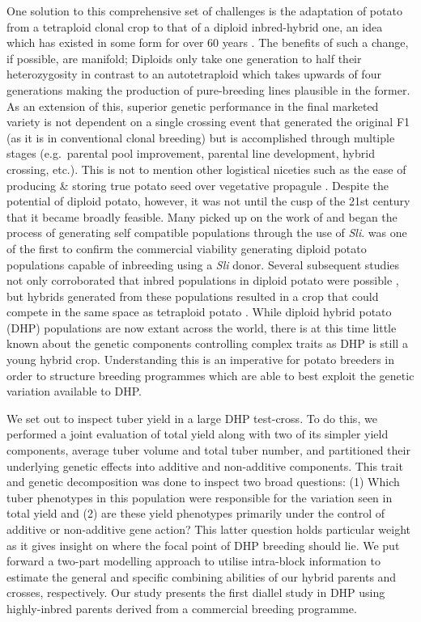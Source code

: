 One solution to this comprehensive set of challenges is the adaptation of potato from a tetraploid clonal crop to that of a diploid inbred-hybrid one, an idea which has existed in some form for over 60 years \parencite{Hougas1958}. The benefits of such a change, if possible, are manifold; Diploids only take one generation to half their heterozygosity in contrast to an autotetraploid which takes upwards of four generations making the production of pure-breeding lines plausible in the former. As an extension of this, superior genetic performance in the final marketed variety is not dependent on a single crossing event that generated the original F1 (as it is in conventional clonal breeding) but is accomplished through multiple stages (e.g.~parental pool improvement, parental line development, hybrid crossing, etc.). This is not to mention other logistical niceties such as the ease of producing \& storing true potato seed over vegetative propagule \parencite{Cock1983, Pallais1991, Thomas-Sharma2016}. Despite the potential of diploid potato, however, it was not until the cusp of the 21st century that it became broadly feasible. Many picked up on the work of \parencite{Hosaka1998} and began the process of generating self compatible populations through the use of \emph{Sli}. \parencite{Lindhout2011} was one of the first to confirm the commercial viability generating diploid potato populations capable of inbreeding using a \emph{Sli} donor. Several subsequent studies not only corroborated that inbred populations in diploid potato were possible \parencite{Alsahlany2021}, but hybrids generated from these populations resulted in a crop that could compete in the same space as tetraploid potato \parencite{Stockem2020, Zhang2021}. While diploid hybrid potato (DHP) populations are now extant across the world, there is at this time little known about the genetic components controlling complex traits as DHP is still a young hybrid crop. Understanding this is an imperative for potato breeders in order to structure breeding programmes which are able to best exploit the genetic variation available to DHP.

We set out to inspect tuber yield in a large DHP test-cross. To do this, we performed a joint evaluation of total yield along with two of its simpler yield components, average tuber volume and total tuber number, and partitioned their underlying genetic effects into additive and non-additive components. This trait and genetic decomposition was done to inspect two broad questions: (1) Which tuber phenotypes in this population were responsible for the variation seen in total yield and (2) are these yield phenotypes primarily under the control of additive or non-additive gene action? This latter question holds particular weight as it gives insight on where the focal point of DHP breeding should lie. We put forward a two-part modelling approach to utilise intra-block information to estimate the general and specific combining abilities of our hybrid parents and crosses, respectively. Our study presents the first diallel study in DHP using highly-inbred parents derived from a commercial breeding programme.


